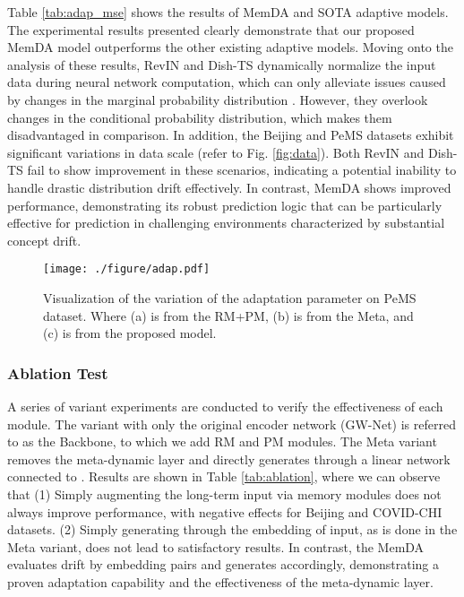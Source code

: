 \documentclass[sigconf]{acmart}
\begin{document}
Table \ref{tab:adap_mse} shows the results of MemDA and SOTA adaptive models. The experimental results presented clearly demonstrate that our proposed MemDA model outperforms the other existing adaptive models. Moving onto the analysis of these results, RevIN and Dish-TS dynamically normalize the input data during neural network computation, which can only alleviate issues caused by changes in the marginal probability distribution . However, they overlook changes in the conditional probability distribution, which makes them disadvantaged in comparison. In addition, the Beijing and PeMS datasets exhibit significant variations in data scale (refer to Fig. \ref{fig:data}). Both RevIN and Dish-TS fail to show improvement in these scenarios, indicating a potential inability to handle drastic distribution drift effectively. In contrast, MemDA shows improved performance, demonstrating its robust prediction logic that can be particularly effective for prediction in challenging environments characterized by substantial concept drift.

\begin{figure}[h]
	\centering
	\texttt{[image: ./figure/adap.pdf]}
	\caption{Visualization of the variation of the adaptation parameter  on PeMS dataset. Where (a) is from the RM+PM, (b) is from the Meta, and (c) is from the proposed model.}
	\label{fig:adaptive}
\end{figure}

\subsubsection{Ablation Test}
A series of variant experiments are conducted to verify the effectiveness of each module. The variant with only the original encoder network (GW-Net) is referred to as the Backbone, to which we add RM and PM modules. The Meta variant removes the meta-dynamic layer and directly generates  through a linear network connected to . Results are shown in Table \ref{tab:ablation}, where we can observe that (1) Simply augmenting the long-term input via memory modules does not always improve performance, with negative effects for Beijing and COVID-CHI datasets. (2) Simply generating  through the embedding of input, as is done in the Meta variant, does not lead to satisfactory results. In contrast, the MemDA evaluates drift by embedding pairs and generates  accordingly, demonstrating a proven adaptation capability and the effectiveness of the meta-dynamic layer.
\end{document}
